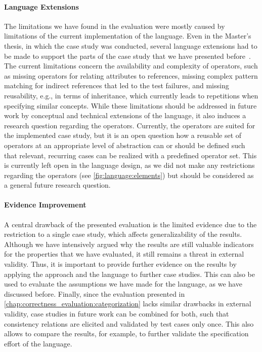 \paragraph{Language Extensions}
The limitations we have found in the evaluation were mostly caused by limitations of the current implementation of the \commonalities language.
Even in the Master's thesis, in which the case study was conducted, several language extensions had to be made to support the parts of the case study that we have presented before~.
The current limitations concern the availability and complexity of operators, such as missing operators for relating attributes to references, missing complex pattern matching for indirect references that led to the test failures, and missing reusability, e.g., in terms of inheritance, which currently leads to repetitions when specifying similar concepts.
While these limitations should be addressed in future work by conceptual and technical extensions of the \commonalities language, it also induces a research question regarding the operators.
Currently, the operators are suited for the implemented case study, but it is an open question how a reusable set of operators at an appropriate level of abstraction can or should be defined such that relevant, recurring cases can be realized with a predefined operator set.
This is currently left open in the language design, as we did not make any restrictions regarding the operators (see \autoref{fig:language:elements}) but should be considered as a general future research question.

\paragraph{Evidence Improvement}
A central drawback of the presented evaluation is the limited evidence due to the restriction to a single case study, which affects generalizability of the results.
Although we have intensively argued why the results are still valuable indicators for the properties that we have evaluated, it still remains a threat in external validity.
Thus, it is important to provide further evidence on the results by applying the approach and the language to further case studies.
This can also be used to evaluate the assumptions we have made for the language, as we have discussed before.
Finally, since the evaluation presented in \autoref{chap:correctness_evaluation:categorization} lacks similar drawbacks in external validity, case studies in future work can be combined for both, such that consistency relations are elicited and validated by test cases only once.
This also allows to compare the results, for example, to further validate the specification effort of the \commonalities language.


